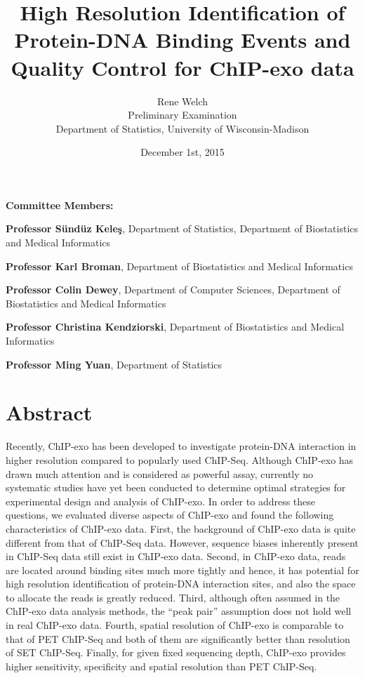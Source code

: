 \documentclass[11pt]{article}\usepackage[]{graphicx}\usepackage[]{color}
\title{High Resolution Identification of Protein-DNA Binding Events
  and Quality Control for ChIP-exo data\vspace*{\fill}}
\author{Rene Welch\\Preliminary Examination\\Department of Statistics, University of Wisconsin-Madison}
\date{December 1st, 2015}
\begin{document}
\newcommand{\sig}{\sigma^{70}}


\maketitle

\vspace*{\fill}

\textbf{Committee Members:}

\textbf{Professor S\"und\"uz Kele\c{s}}, Department of Statistics,
Department of Biostatistics and Medical Informatics

\textbf{Professor Karl Broman}, Department of Biostatistics and
Medical Informatics

\textbf{Professor Colin Dewey}, Department of Computer Sciences,
Department of Biostatistics and Medical Informatics

\textbf{Professor Christina Kendziorski}, Department of Biostatistics
and Medical Informatics

\textbf{Professor Ming Yuan}, Department of Statistics

\thispagestyle{empty}


\newpage

\tableofcontents

\newpage

\listoffigures

\newpage


\section*{Abstract}

    Recently, ChIP-exo has been developed to investigate protein-DNA
    interaction in higher resolution compared to popularly used
    ChIP-Seq. Although ChIP-exo has drawn much attention and is
    considered as powerful assay, currently no systematic studies
    have yet been conducted to determine optimal strategies for
    experimental design and analysis of ChIP-exo. In order to address
    these questions, we evaluated diverse aspects of ChIP-exo and
    found the following characteristics of ChIP-exo data. First, the
    background of ChIP-exo data is quite different from that of
    ChIP-Seq data. However, sequence biases inherently present in
    ChIP-Seq data still exist in ChIP-exo data. Second, in ChIP-exo
    data, reads are located around binding sites much more tightly and
    hence, it has potential for high resolution identification of
    protein-DNA interaction sites, and also the space to allocate the
    reads is greatly reduced. Third, although often assumed in the
    ChIP-exo data analysis methods, the ``peak pair'' assumption does
    not hold well in real ChIP-exo data. Fourth, spatial resolution of
    ChIP-exo is comparable to that of PET ChIP-Seq and both of them
    are significantly better than resolution of SET ChIP-Seq. Finally,
    for given fixed sequencing depth, ChIP-exo provides higher
    sensitivity, specificity and spatial resolution than PET
    ChIP-Seq.
\end{document}
